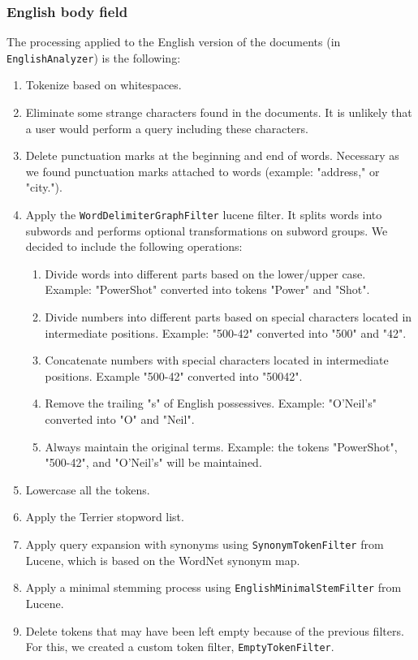 \subsubsection{English body field}
The processing applied to the English version of the documents (in \texttt{EnglishAnalyzer}) is the following:
\begin{enumerate}
    \item Tokenize based on whitespaces.
    \item Eliminate some strange characters found in the documents.
    It is unlikely that a user would perform a query including these characters.
    \item Delete punctuation marks at the beginning and end of words.
    Necessary as we found punctuation marks attached to words (example: "address," or "city.").
    \item Apply the \texttt{WordDelimiterGraphFilter} lucene filter.
    It splits words into subwords and performs optional transformations on subword groups.
    We decided to include the following operations:
    \begin{enumerate}
        \item Divide words into different parts based on the lower/upper case.
        Example: "PowerShot" converted into tokens "Power" and "Shot".
        \item Divide numbers into different parts based on special characters located in intermediate positions.
        Example: "500-42" converted into "500" and "42".
        \item Concatenate numbers with special characters located in intermediate positions.
        Example "500-42" converted into "50042".
        \item Remove the trailing "s" of English possessives.
        Example: "O'Neil's" converted into "O" and "Neil".
        \item Always maintain the original terms.
        Example: the tokens "PowerShot", "500-42", and "O'Neil's" will be maintained.
    \end{enumerate}
    \item Lowercase all the tokens.
    \item Apply the Terrier\cite{OunisEtAl2006} stopword list.
    \item Apply query expansion with synonyms using \texttt{SynonymTokenFilter} from Lucene, which is based on the
    WordNet synonym map\cite{wordnet}.
    \item Apply a minimal stemming process using \texttt{EnglishMinimalStemFilter} from Lucene.
    \item Delete tokens that may have been left empty because of the previous filters.
    For this, we created a custom token filter, \texttt{EmptyTokenFilter}.
\end{enumerate}

